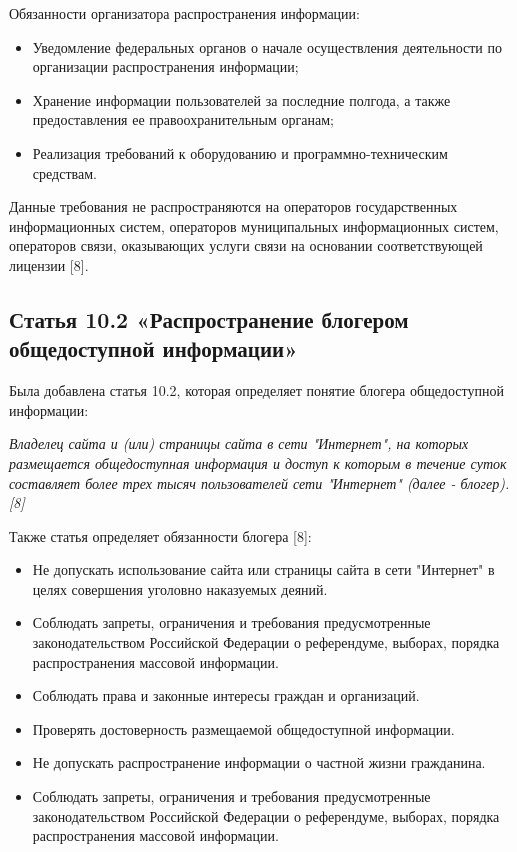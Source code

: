\documentclass[14pt,a4paper,report]{article}
\begin{document}
Обязанности организатора распространения информации:

\begin{itemize}
	\item Уведомление федеральных органов о начале осуществления деятельности по организации распространения информации;
	\item Хранение информации пользователей за последние полгода, а также предоставления ее правоохранительным органам;
	\item Реализация требований к оборудованию и программно-техническим средствам.
\end{itemize}

Данные требования не распространяются на операторов государственных информационных систем, операторов муниципальных информационных систем, операторов связи, оказывающих услуги связи на основании соответствующей лицензии [8].

\subsection{Статья 10.2 «Распространение блогером общедоступной информации»}

Была добавлена статья 10.2, которая определяет понятие блогера общедоступной информации:

\begin{displayquote}
	\emph{Владелец сайта и (или) страницы сайта в сети "Интернет", на которых размещается общедоступная информация и доступ к которым в течение суток составляет более трех тысяч пользователей сети "Интернет" (далее - блогер). [8]}
\end{displayquote}

Также статья определяет обязанности блогера [8]:

\begin{itemize}
	\item Не допускать использование сайта или страницы сайта в сети "Интернет" в целях совершения уголовно наказуемых деяний.
	\item Соблюдать запреты, ограничения и требования предусмотренные законодательством Российской Федерации о референдуме, выборах, порядка распространения массовой информации.
	\item Соблюдать права и законные интересы граждан и организаций.
	\item Проверять достоверность размещаемой общедоступной информации.
	\item Не допускать распространение информации о частной жизни гражданина.
	\item Соблюдать запреты, ограничения и требования предусмотренные законодательством Российской Федерации о референдуме, выборах, порядка распространения массовой информации.
\end{itemize}
\end{document}
